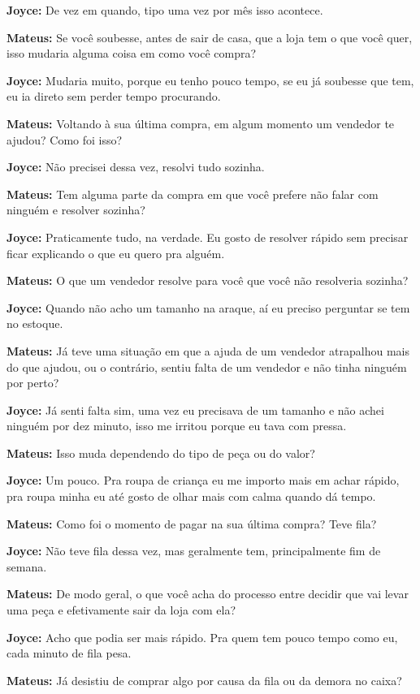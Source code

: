 \textbf{Joyce:} De vez em quando, tipo uma vez por mês isso acontece.

\textbf{Mateus:} Se você soubesse, antes de sair de casa, que a loja tem o que você quer, isso mudaria alguma coisa em como você compra?

\textbf{Joyce:} Mudaria muito, porque eu tenho pouco tempo, se eu já soubesse que tem, eu ia direto sem perder tempo procurando.

\textbf{Mateus:} Voltando à sua última compra, em algum momento um vendedor te ajudou? Como foi isso?

\textbf{Joyce:} Não precisei dessa vez, resolvi tudo sozinha.

\textbf{Mateus:} Tem alguma parte da compra em que você prefere não falar com ninguém e resolver sozinha?

\textbf{Joyce:} Praticamente tudo, na verdade. Eu gosto de resolver rápido sem precisar ficar explicando o que eu quero pra alguém.

\textbf{Mateus:} O que um vendedor resolve para você que você não resolveria sozinha?

\textbf{Joyce:} Quando não acho um tamanho na araque, aí eu preciso perguntar se tem no estoque.

\textbf{Mateus:} Já teve uma situação em que a ajuda de um vendedor atrapalhou mais do que ajudou, ou o contrário, sentiu falta de um vendedor e não tinha ninguém por perto?

\textbf{Joyce:} Já senti falta sim, uma vez eu precisava de um tamanho e não achei ninguém por dez minuto, isso me irritou porque eu tava com pressa.

\textbf{Mateus:} Isso muda dependendo do tipo de peça ou do valor?

\textbf{Joyce:} Um pouco. Pra roupa de criança eu me importo mais em achar rápido, pra roupa minha eu até gosto de olhar mais com calma quando dá tempo.

\textbf{Mateus:} Como foi o momento de pagar na sua última compra? Teve fila?

\textbf{Joyce:} Não teve fila dessa vez, mas geralmente tem, principalmente fim de semana.

\textbf{Mateus:} De modo geral, o que você acha do processo entre decidir que vai levar uma peça e efetivamente sair da loja com ela?

\textbf{Joyce:} Acho que podia ser mais rápido. Pra quem tem pouco tempo como eu, cada minuto de fila pesa.

\textbf{Mateus:} Já desistiu de comprar algo por causa da fila ou da demora no caixa?

